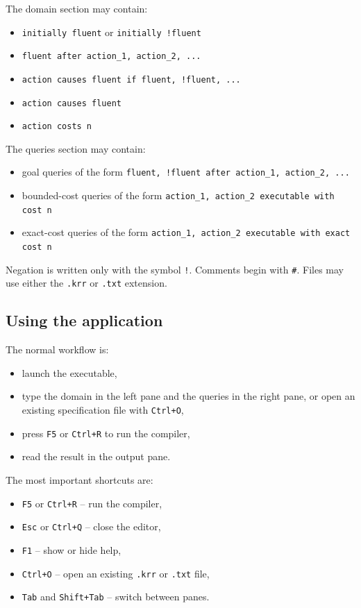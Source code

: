\documentclass[11pt]{article}
\begin{document}
The domain section may contain:
\begin{itemize}
    \item \texttt{initially fluent} or \texttt{initially !fluent}
    \item \texttt{fluent after action\_1, action\_2, ...}
    \item \texttt{action causes fluent if fluent, !fluent, ...}
    \item \texttt{action causes fluent}
    \item \texttt{action costs n}
\end{itemize}

The queries section may contain:
\begin{itemize}
    \item goal queries of the form
    \texttt{fluent, !fluent after action\_1, action\_2, ...}
    \item bounded-cost queries of the form
    \texttt{action\_1, action\_2 executable with cost n}
    \item exact-cost queries of the form
    \texttt{action\_1, action\_2 executable with exact cost n}
\end{itemize}

Negation is written only with the symbol \texttt{!}. Comments begin with
\texttt{\#}. Files may use either the \texttt{.krr} or \texttt{.txt} extension.

\subsection{Using the application}
The normal workflow is:
\begin{itemize}
    \item launch the executable,
    \item type the domain in the left pane and the queries in the right pane,
    or open an existing specification file with \texttt{Ctrl+O},
    \item press \texttt{F5} or \texttt{Ctrl+R} to run the compiler,
    \item read the result in the output pane.
\end{itemize}

The most important shortcuts are:
\begin{itemize}
    \item \texttt{F5} or \texttt{Ctrl+R} -- run the compiler,
    \item \texttt{Esc} or \texttt{Ctrl+Q} -- close the editor,
    \item \texttt{F1} -- show or hide help,
    \item \texttt{Ctrl+O} -- open an existing \texttt{.krr} or \texttt{.txt} file,
    \item \texttt{Tab} and \texttt{Shift+Tab} -- switch between panes.
\end{itemize}
\end{document}
